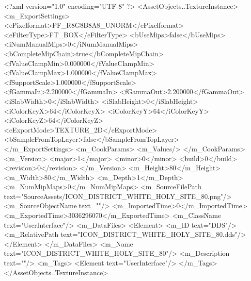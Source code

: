 <?xml version="1.0" encoding="UTF-8" ?>
<AssetObjects..TextureInstance>
	<m_ExportSettings>
		<ePixelformat>PF_R8G8B8A8_UNORM</ePixelformat>
		<eFilterType>FT_BOX</eFilterType>
		<bUseMips>false</bUseMips>
		<iNumManualMips>0</iNumManualMips>
		<bCompleteMipChain>true</bCompleteMipChain>
		<fValueClampMin>0.000000</fValueClampMin>
		<fValueClampMax>1.000000</fValueClampMax>
		<fSupportScale>1.000000</fSupportScale>
		<fGammaIn>2.200000</fGammaIn>
		<fGammaOut>2.200000</fGammaOut>
		<iSlabWidth>0</iSlabWidth>
		<iSlabHeight>0</iSlabHeight>
		<iColorKeyX>64</iColorKeyX>
		<iColorKeyY>64</iColorKeyY>
		<iColorKeyZ>64</iColorKeyZ>
		<eExportMode>TEXTURE_2D</eExportMode>
		<bSampleFromTopLayer>false</bSampleFromTopLayer>
	</m_ExportSettings>
	<m_CookParams>
		<m_Values/>
	</m_CookParams>
	<m_Version>
		<major>1</major>
		<minor>0</minor>
		<build>0</build>
		<revision>0</revision>
	</m_Version>
	<m_Height>80</m_Height>
	<m_Width>80</m_Width>
	<m_Depth>1</m_Depth>
	<m_NumMipMaps>0</m_NumMipMaps>
	<m_SourceFilePath text="SourceAssets/ICON_DISTRICT_WHITE_HOLY_SITE_80.png"/>
	<m_SourceObjectName text=""/>
	<m_ImportedTime>0</m_ImportedTime>
	<m_ExportedTime>3036296070</m_ExportedTime>
	<m_ClassName text="UserInterface"/>
	<m_DataFiles>
		<Element>
			<m_ID text="DDS"/>
			<m_RelativePath text="ICON_DISTRICT_WHITE_HOLY_SITE_80.dds"/>
		</Element>
	</m_DataFiles>
	<m_Name text="ICON_DISTRICT_WHITE_HOLY_SITE_80"/>
	<m_Description text=""/>
	<m_Tags>
		<Element text="UserInterface"/>
	</m_Tags>
</AssetObjects..TextureInstance>

